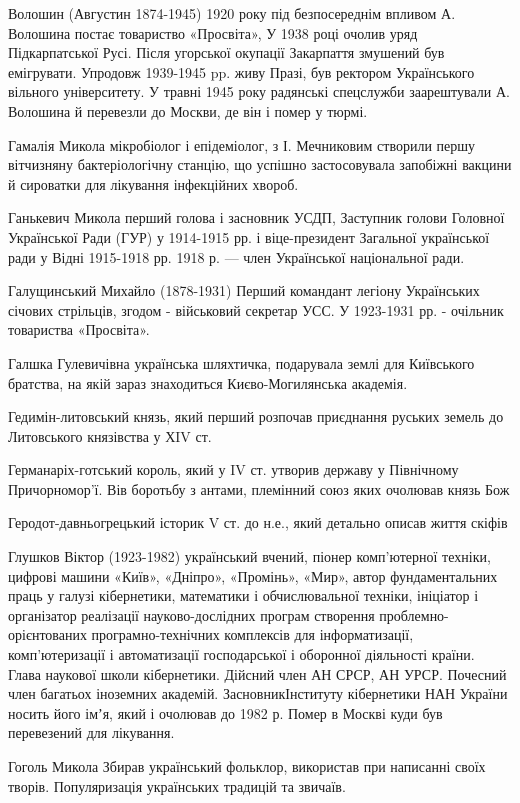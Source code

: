 Волошин (Августин 1874-1945) 1920 року під безпосереднім впливом А. Волошина постає товариство «Просвіта», У 1938 році очолив уряд Підкарпатської Русі. Після угорської окупації Закарпаття змушений був емігрувати. Упродовж 1939-1945 pp. живу Празі, був ректором Українського вільного університету. У травні 1945 року радянські спецслужби заарештували А. Волошина й перевезли до Москви, де він і помер у тюрмі.

Гамалія Микола  мікробіолог і епідеміолог, з І. Мечниковим створили першу вітчизняну бактеріологічну станцію, що успішно застосовувала запобіжні вакцини й сироватки для лікування інфекційних хвороб.

Ганькевич Микола перший голова і засновник УСДП,  Заступник голови Головної Української Ради (ГУР) у 1914-1915 рр. і віце-президент Загальної української ради у Відні 1915-1918 рр. 1918 р. --- член Української національної ради. 

Галущинський Михайло (1878-1931) Перший командант легіону Українських січових стрільців, згодом - військовий секретар УСС.  У 1923-1931 рр. - очільник товариства «Просвіта».

Галшка Гулевичівна українська шляхтичка, подарувала землі для Київського братства, на якій зараз знаходиться Києво-Могилянська академія.

Гедимін-литовський князь, який перший розпочав приєднання руських земель до Литовського князівства у ХIV ст.

Германаріх-готський король, який у IV ст. утворив державу у Північному Причорномор’ї. Вів боротьбу з антами, племінний союз яких очолював князь Бож

Геродот-давньогрецький історик V ст. до н.е., який детально описав життя скіфів

Глушков Віктор (1923-1982) український вчений, піонер комп'ютерної техніки, цифрові машини «Київ», «Дніпро», «Промінь», «Мир», автор фундаментальних праць у галузі кібернетики, математики і обчислювальної техніки, ініціатор і організатор реалізації науково-дослідних програм створення проблемно-орієнтованих програмно-технічних комплексів для інформатизації, комп'ютеризації і автоматизації господарської і оборонної діяльності країни. Глава наукової школи кібернетики. Дійсний член АН СРСР, АН УРСР. Почесний член багатьох іноземних академій. ЗасновникІнституту кібернетики  НАН України носить його імʼя, який і очолював до 1982 р. Помер в Москві куди був перевезений для лікування. 

Гоголь Микола Збирав український фольклор, використав при написанні своїх творів. Популяризація українських традицій та звичаїв.

